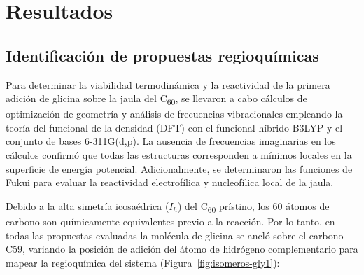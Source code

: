 
                                                                                                                                                                                                                                                                                                                                                                                                                                                                                                                                                                                                                                                                                                                                                                                                                                                                                                                                                                                                                                                                                                                                                                                                                                 \chapter{Resultados}
\section{Identificación de propuestas regioquímicas}

Para determinar la viabilidad termodinámica y la reactividad de la primera adición de glicina sobre la jaula del C\textsubscript{60}, se llevaron a cabo cálculos de optimización de geometría y análisis de frecuencias vibracionales empleando la teoría del funcional de la densidad (DFT) con el funcional híbrido B3LYP y el conjunto de bases 6-311G(d,p). La ausencia de frecuencias imaginarias en los cálculos confirmó que todas las estructuras corresponden a mínimos locales en la superficie de energía potencial. Adicionalmente, se determinaron las funciones de Fukui para evaluar la reactividad electrofílica y nucleofílica local de la jaula.

Debido a la alta simetría icosaédrica ($I_h$) del C\textsubscript{60} prístino, los 60 átomos de carbono son químicamente equivalentes previo a la reacción. Por lo tanto, en todas las propuestas evaluadas la molécula de glicina se ancló sobre el carbono C59, variando la posición de adición del átomo de hidrógeno complementario para mapear la regioquímica del sistema (Figura~\ref{fig:isomeros-gly1}):

